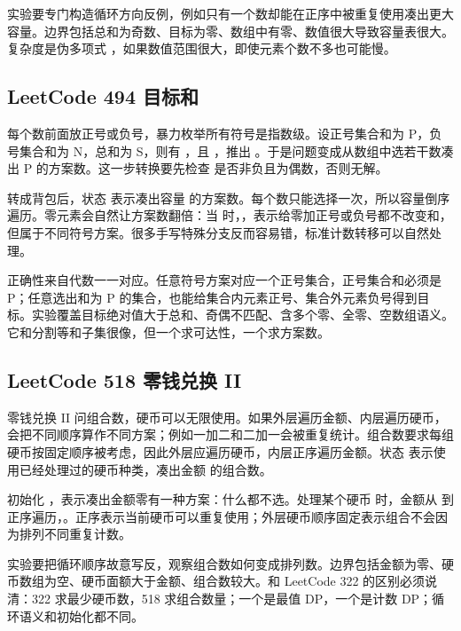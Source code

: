 实验要专门构造循环方向反例，例如只有一个数却能在正序中被重复使用凑出更大容量。边界包括总和为奇数、目标为零、数组中有零、数值很大导致容量表很大。复杂度是伪多项式 ，如果数值范围很大，即使元素个数不多也可能慢。

\subsection{LeetCode 494 目标和}

每个数前面放正号或负号，暴力枚举所有符号是指数级。设正号集合和为 P，负号集合和为 N，总和为 S，则有 ，且 ，推出 。于是问题变成从数组中选若干数凑出 P 的方案数。这一步转换要先检查  是否非负且为偶数，否则无解。

转成背包后，状态  表示凑出容量  的方案数。每个数只能选择一次，所以容量倒序遍历。零元素会自然让方案数翻倍：当  时，，表示给零加正号或负号都不改变和，但属于不同符号方案。很多手写特殊分支反而容易错，标准计数转移可以自然处理。

正确性来自代数一一对应。任意符号方案对应一个正号集合，正号集合和必须是 P；任意选出和为 P 的集合，也能给集合内元素正号、集合外元素负号得到目标。实验覆盖目标绝对值大于总和、奇偶不匹配、含多个零、全零、空数组语义。它和分割等和子集很像，但一个求可达性，一个求方案数。

\subsection{LeetCode 518 零钱兑换 II}

零钱兑换 II 问组合数，硬币可以无限使用。如果外层遍历金额、内层遍历硬币，会把不同顺序算作不同方案；例如一加二和二加一会被重复统计。组合数要求每组硬币按固定顺序被考虑，因此外层应遍历硬币，内层正序遍历金额。状态  表示使用已经处理过的硬币种类，凑出金额  的组合数。

初始化 ，表示凑出金额零有一种方案：什么都不选。处理某个硬币  时，金额从  到  正序遍历，。正序表示当前硬币可以重复使用；外层硬币顺序固定表示组合不会因为排列不同重复计数。

实验要把循环顺序故意写反，观察组合数如何变成排列数。边界包括金额为零、硬币数组为空、硬币面额大于金额、组合数较大。和 LeetCode 322 的区别必须说清：322 求最少硬币数，518 求组合数量；一个是最值 DP，一个是计数 DP；循环语义和初始化都不同。

